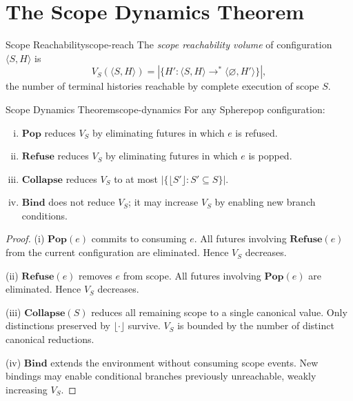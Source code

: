 \documentclass[12pt,twoside,openright]{book}
\begin{document}
\section{The Scope Dynamics Theorem}

\begin{definition}{Scope Reachability}{scope-reach}
  The \emph{scope reachability volume} of configuration
  $\langle S, H \rangle$ is
  \[
    V_S(\langle S, H \rangle)
    = |\{H' : \langle S, H \rangle \to^* \langle \varnothing, H' \rangle\}|,
  \]
  the number of terminal histories reachable by complete
  execution of scope $S$.
\end{definition}

\begin{theorem}{Scope Dynamics Theorem}{scope-dynamics}
  For any Spherepop configuration:
  \begin{enumerate}[(i)]
    \item $\mathbf{Pop}$ reduces $V_S$ by eliminating
          futures in which $e$ is refused.
    \item $\mathbf{Refuse}$ reduces $V_S$ by eliminating
          futures in which $e$ is popped.
    \item $\mathbf{Collapse}$ reduces $V_S$ to at most
          $|\{\lfloor S' \rfloor : S' \subseteq S\}|$.
    \item $\mathbf{Bind}$ does not reduce $V_S$; it may
          increase $V_S$ by enabling new branch conditions.
  \end{enumerate}
\end{theorem}

\begin{proof}
  (i) $\mathbf{Pop}(e)$ commits to consuming $e$.
  All futures involving $\mathbf{Refuse}(e)$ from the
  current configuration are eliminated.
  Hence $V_S$ decreases.

  (ii) $\mathbf{Refuse}(e)$ removes $e$ from scope.
  All futures involving $\mathbf{Pop}(e)$ are eliminated.
  Hence $V_S$ decreases.

  (iii) $\mathbf{Collapse}(S)$ reduces all remaining
  scope to a single canonical value. Only distinctions
  preserved by $\lfloor \cdot \rfloor$ survive.
  $V_S$ is bounded by the number of distinct canonical
  reductions.

  (iv) $\mathbf{Bind}$ extends the environment without
  consuming scope events. New bindings may enable
  conditional branches previously unreachable, weakly
  increasing $V_S$.
\end{proof}
\end{document}
